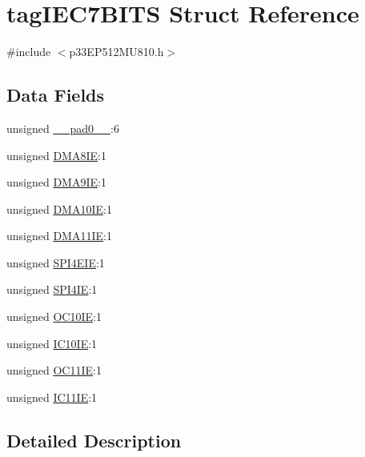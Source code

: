 \hypertarget{structtag_i_e_c7_b_i_t_s}{}\section{tag\+I\+E\+C7\+B\+I\+TS Struct Reference}
\label{structtag_i_e_c7_b_i_t_s}


{\ttfamily \#include $<$p33\+E\+P512\+M\+U810.\+h$>$}

\subsection*{Data Fields}
\begin{DoxyCompactItemize}
\item 
unsigned \hyperlink{structtag_i_e_c7_b_i_t_s_adf71f3d8410c1f1dbbc96680a92c49af}{\+\_\+\+\_\+pad0\+\_\+\+\_\+}\+:6
\item 
unsigned \hyperlink{structtag_i_e_c7_b_i_t_s_a6e2efc8925d132ad6bd26859f8603660}{D\+M\+A8\+IE}\+:1
\item 
unsigned \hyperlink{structtag_i_e_c7_b_i_t_s_a0fd585c1c916b0f7c03caa0c9d40e797}{D\+M\+A9\+IE}\+:1
\item 
unsigned \hyperlink{structtag_i_e_c7_b_i_t_s_ad569a0ae2dd3f29f4bccf4f2c1e5c1e3}{D\+M\+A10\+IE}\+:1
\item 
unsigned \hyperlink{structtag_i_e_c7_b_i_t_s_a5c4cfb1cec75e7ee5ef15f1a843f06b5}{D\+M\+A11\+IE}\+:1
\item 
unsigned \hyperlink{structtag_i_e_c7_b_i_t_s_a59793bddffc48c0ba414545726191bfb}{S\+P\+I4\+E\+IE}\+:1
\item 
unsigned \hyperlink{structtag_i_e_c7_b_i_t_s_ab98b0e4c48d90109fe2f5ada0eb40b30}{S\+P\+I4\+IE}\+:1
\item 
unsigned \hyperlink{structtag_i_e_c7_b_i_t_s_a11db11560c7584a3993c6efc541fba61}{O\+C10\+IE}\+:1
\item 
unsigned \hyperlink{structtag_i_e_c7_b_i_t_s_a1d8256dad96e85d1e77d6f174249d094}{I\+C10\+IE}\+:1
\item 
unsigned \hyperlink{structtag_i_e_c7_b_i_t_s_a4f87db67cfb85cd6251b570e3c79e959}{O\+C11\+IE}\+:1
\item 
unsigned \hyperlink{structtag_i_e_c7_b_i_t_s_af3a324b863838f3ce31cfa160cac7777}{I\+C11\+IE}\+:1
\end{DoxyCompactItemize}


\subsection{Detailed Description}


